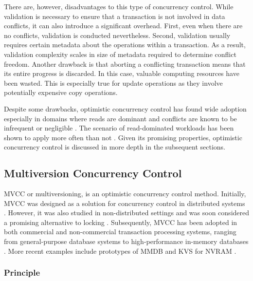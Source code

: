 There are, however, disadvantages to this type of concurrency control. While
validation is necessary to ensure that a transaction is not involved in data
conflicts, it can also introduce a significant overhead. First, even when there
are no conflicts, validation is conducted nevertheless. Second, validation
usually requires certain metadata about the operations within a transaction. As
a result, validation complexity scales in size of metadata required to
determine conflict freedom. Another drawback is that aborting a conflicting
transaction means that its entire progress is discarded. In this case, valuable
computing resources have been wasted. This is especially true for update
operations as they involve potentially expensive copy operations.

Despite some drawbacks, optimistic concurrency control has found wide adoption
especially in domains where reads are dominant and conflicts are known to be
infrequent or negligible \cite{carey1986performance, larson2011high,
wu2017empirical}. The scenario of read-dominated workloads has been shown to
apply more often than not \cite{andrei2017sap, wang2017efficiently}. Given its
promising properties, optimistic concurrency control is discussed in more depth
in the subsequent sections.

\subsection{Multiversion Concurrency Control}

MVCC or multiversioning, is an optimistic concurrency control method. Initially,
MVCC was designed as a solution for concurrency control in distributed systems
\cite{reed1978naming}. However, it was also studied in non-distributed settings
and was soon considered a promising alternative to locking
\cite{kung1981optimistic, bernstein1983multiversion, carey1983multiple,
hadzilacos1986algorithmic, carey1986performance}. Subsequently, MVCC has been
adopted in both commercial and non-commercial transaction processing systems,
ranging from general-purpose database systems to high-performance in-memory
databases \cite{larson2011high, lee2013high, diaconu2013hekaton,
schwalb2015efficient}. More recent examples include prototypes of MMDB and KVS
for NVRAM \cite{bailey2013exploring, zhou2016nvht, oukid2014sofort,
schwalb2016hyrise}.

\subsubsection{Principle}

